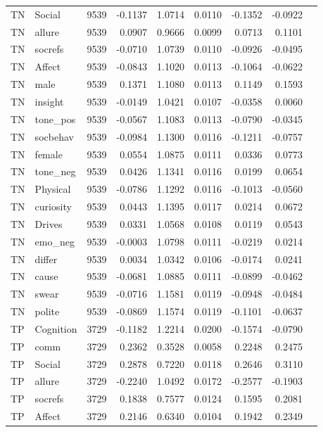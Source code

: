 \begin{longtable}{@{}llrrrrrrr@{}}
TN & Social & 9539 & -0.1137 & 1.0714 & 0.0110 & -0.1352 & -0.0922 \\
TN & allure & 9539 & 0.0907 & 0.9666 & 0.0099 & 0.0713 & 0.1101 \\
TN & socrefs & 9539 & -0.0710 & 1.0739 & 0.0110 & -0.0926 & -0.0495 \\
TN & Affect & 9539 & -0.0843 & 1.1020 & 0.0113 & -0.1064 & -0.0622 \\
TN & male & 9539 & 0.1371 & 1.1080 & 0.0113 & 0.1149 & 0.1593 \\
TN & insight & 9539 & -0.0149 & 1.0421 & 0.0107 & -0.0358 & 0.0060 \\
TN & tone\_pos & 9539 & -0.0567 & 1.1083 & 0.0113 & -0.0790 & -0.0345 \\
TN & socbehav & 9539 & -0.0984 & 1.1300 & 0.0116 & -0.1211 & -0.0757 \\
TN & female & 9539 & 0.0554 & 1.0875 & 0.0111 & 0.0336 & 0.0773 \\
TN & tone\_neg & 9539 & 0.0426 & 1.1341 & 0.0116 & 0.0199 & 0.0654 \\
TN & Physical & 9539 & -0.0786 & 1.1292 & 0.0116 & -0.1013 & -0.0560 \\
TN & curiosity & 9539 & 0.0443 & 1.1395 & 0.0117 & 0.0214 & 0.0672 \\
TN & Drives & 9539 & 0.0331 & 1.0568 & 0.0108 & 0.0119 & 0.0543 \\
TN & emo\_neg & 9539 & -0.0003 & 1.0798 & 0.0111 & -0.0219 & 0.0214 \\
TN & differ & 9539 & 0.0034 & 1.0342 & 0.0106 & -0.0174 & 0.0241 \\
TN & cause & 9539 & -0.0681 & 1.0885 & 0.0111 & -0.0899 & -0.0462 \\
TN & swear & 9539 & -0.0716 & 1.1581 & 0.0119 & -0.0948 & -0.0484 \\
TN & polite & 9539 & -0.0869 & 1.1574 & 0.0119 & -0.1101 & -0.0637 \\
TP & Cognition & 3729 & -0.1182 & 1.2214 & 0.0200 & -0.1574 & -0.0790 \\
TP & comm & 3729 & 0.2362 & 0.3528 & 0.0058 & 0.2248 & 0.2475 \\
TP & Social & 3729 & 0.2878 & 0.7220 & 0.0118 & 0.2646 & 0.3110 \\
TP & allure & 3729 & -0.2240 & 1.0492 & 0.0172 & -0.2577 & -0.1903 \\
TP & socrefs & 3729 & 0.1838 & 0.7577 & 0.0124 & 0.1595 & 0.2081 \\
TP & Affect & 3729 & 0.2146 & 0.6340 & 0.0104 & 0.1942 & 0.2349 \\

\end{longtable}
